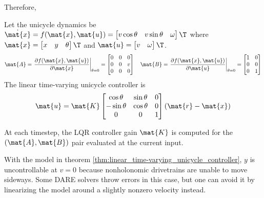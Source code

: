 Therefore,
\begin{theorem}
  \label{thm:linear_time-varying_unicycle_controller}

  Let the unicycle dynamics be
  $\dot{\mat{x}} = f(\mat{x}, \mat{u}) =
  \begin{bmatrix}
    v\cos\theta &
    v\sin\theta &
    \omega
  \end{bmatrix}\T$ where
  $\mat{x} =
  \begin{bmatrix}
    x &
    y &
    \theta
  \end{bmatrix}\T$ and
  $\mat{u} =
  \begin{bmatrix}
    v &
    \omega
  \end{bmatrix}\T$.
  \begin{equation}
    \mat{A} = \left.
      \frac{\partial f(\mat{x}, \mat{u})}{\partial\mat{x}}
    \right|_{\theta = 0} =
    \begin{bmatrix}
      0 & 0 & 0 \\
      0 & 0 & v \\
      0 & 0 & 0
    \end{bmatrix}
    \quad
    \mat{B} = \left.
      \frac{\partial f(\mat{x}, \mat{u})}{\partial\mat{u}}
    \right|_{\theta = 0} =
    \begin{bmatrix}
      1 & 0 \\
      0 & 0 \\
      0 & 1
    \end{bmatrix}
  \end{equation}
  The linear time-varying unicycle controller is
  \begin{equation}
    \mat{u} = \mat{K}
    \begin{bmatrix}
      \cos\theta & \sin\theta & 0 \\
      -\sin\theta & \cos\theta & 0 \\
      0 & 0 & 1
    \end{bmatrix}
    (\mat{r} - \mat{x})
  \end{equation}

  At each timestep, the LQR controller gain $\mat{K}$ is computed for the
  $(\mat{A}, \mat{B})$ pair evaluated at the current input.
\end{theorem}

With the \gls{model} in theorem
\ref{thm:linear_time-varying_unicycle_controller}, $y$ is uncontrollable at
$v = 0$ because nonholonomic drivetrains are unable to move sideways. Some DARE
solvers throw errors in this case, but one can avoid it by linearizing the model
around a slightly nonzero velocity instead.


